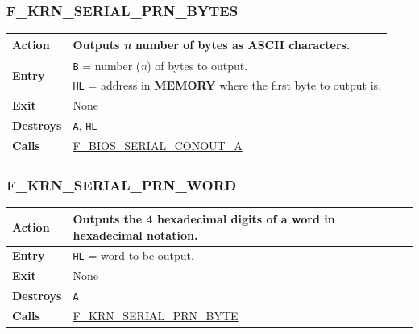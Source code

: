 \documentclass[a4paper,11pt]{article}
\begin{document}
        \subsubsection{F\_KRN\_SERIAL\_PRN\_BYTES}
        \label{func:fkrnserialprnbytes}
        \begin{tabular}{l p{9cm}}
            \hline\textbf{Action}
            & Outputs \textit{n} number of bytes as ASCII characters.\\
            \hline\multirow[t]{2}{4em}{\textbf{Entry}}
            & \texttt{B} = number (\textit{n}) of bytes to output.\\
            & \texttt{HL} = address in \textbf{MEMORY} where the first byte to
            output is. \\
            \hline\textbf{Exit} & None \\
            \hline\textbf{Destroys} & \texttt{A}, \texttt{HL} \\
            \hline\textbf{Calls}
            & \hyperref[func:fbiosserialconouta]{F\_BIOS\_SERIAL\_CONOUT\_A}\\
            \hline
        \end{tabular}

        \subsubsection{F\_KRN\_SERIAL\_PRN\_WORD}
        \label{func:fkrnserialprnword}
        \begin{tabular}{l p{9cm}}
            \hline\textbf{Action}
            & Outputs the 4 hexadecimal digits of a word in hexadecimal notation.\\
            \hline\textbf{Entry}
            & \texttt{HL} = word to be output.\\
            \hline\textbf{Exit} & None \\
            \hline\textbf{Destroys} & \texttt{A} \\
            \hline\textbf{Calls}
            & \hyperref[func:fkrnserialprnbyte]{F\_KRN\_SERIAL\_PRN\_BYTE}\\
            \hline
        \end{tabular}

\end{document}
